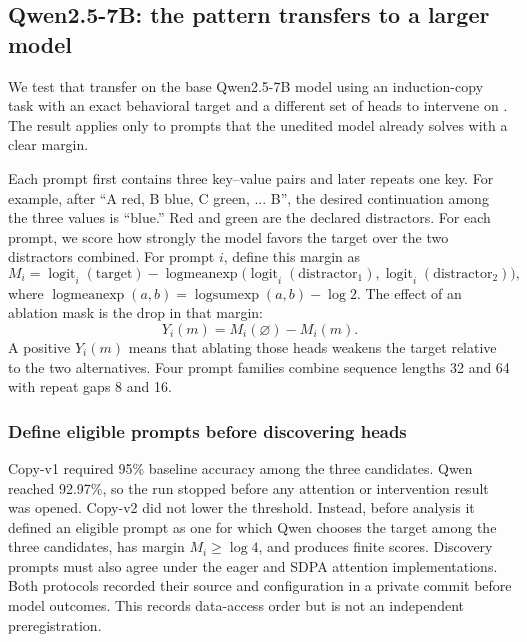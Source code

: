 
\subsection{Qwen2.5-7B: the pattern transfers to a larger model}
\label{sec:qwen-induction}

We test that transfer on the base Qwen2.5-7B model
\cite{qwen2024qwen25} using an induction-copy task with an exact behavioral
target and a different set of heads to intervene on
\cite{olsson2022induction}. The result applies only to prompts that the
unedited model already solves with a clear margin.

Each prompt first contains three key--value pairs and later repeats one key.
For example, after ``A red, B blue, C green, ... B'', the desired continuation
among the three values is ``blue.'' Red and green are the declared distractors.
For each prompt, we score how strongly the model favors the target over the two
distractors combined. For prompt $i$, define this margin as
\[
M_i=\operatorname{logit}_i(\text{target})-
\operatorname{logmeanexp}
\bigl(\operatorname{logit}_i(\text{distractor}_1),
      \operatorname{logit}_i(\text{distractor}_2)\bigr),
\]
where
$\operatorname{logmeanexp}(a,b)=\operatorname{logsumexp}(a,b)-\log 2$.
The effect of an ablation mask is the drop in that margin:
\[
Y_i(m)=M_i(\varnothing)-M_i(m).
\]
A positive $Y_i(m)$ means that ablating those heads weakens the target relative
to the two alternatives. Four prompt families combine sequence lengths 32 and
64 with repeat gaps 8 and 16.

\subsubsection{Define eligible prompts before discovering heads}

Copy-v1 required 95\% baseline accuracy among the three candidates. Qwen reached
92.97\%, so the run stopped before any attention or intervention result was
opened. Copy-v2 did not lower the threshold. Instead, before analysis it defined
an eligible prompt as one for which Qwen chooses the target among the three
candidates, has margin $M_i\geq\log 4$, and produces finite scores. Discovery
prompts must also agree under the eager and SDPA attention implementations.
Both protocols recorded their source and configuration in a private commit
before model outcomes. This records data-access order but is not an independent
preregistration.

